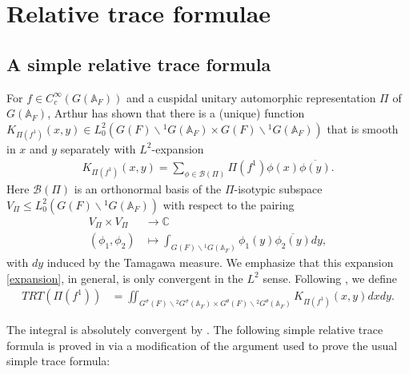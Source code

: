 \documentclass[12pt]{amsart}
\theoremstyle{remark}
\numberwithin{equation}{section}
\newcommand{\A}{\mathbb{A}}
\newcommand{\lto}{\longrightarrow}
\newcommand{\CC}{\mathbb{C}}
\theoremstyle{definition}
\numberwithin{equation}{subsection}
\begin{document}
\section{Relative trace formulae}
\label{sec-rtf}

\subsection{A simple relative trace formula} \label{ssec-sRTF}

For $f \in C_c^{\infty}(G(\A_F))$ and a cuspidal unitary automorphic representation $\Pi$ of $G(\A_F)$, Arthur has shown \cite[Lemma 4.5, Lemma 4.8]{A}
that there is a (unique) function $K_{\Pi(f^1)}(x,y) \in L_0^2(G(F) \backslash {}^1G(\A_F) \times G(F) \backslash {}^1G(\A_F))$  that is smooth in $x$ and $y$ separately with $L^2$-expansion
\begin{align} \label{expansion}
K_{\Pi(f^1)}(x,y)=\sum_{\phi \in \mathcal{B}(\Pi)} \Pi(f^1){\phi}(x)\overline{{\phi}(y)}.
\end{align}
Here $\mathcal{B}(\Pi)$  is an orthonormal basis of the $\Pi$-isotypic subspace $V_{\Pi} \leq L^2_0(G(F) \backslash {}^1G(\A_F))$ with respect to the pairing
\begin{align} \label{ortho-pair}
V_{\Pi} \times V_{\Pi} &\lto \CC\\
\nonumber (\phi_1,\phi_2) &\longmapsto \int_{G(F) \backslash {}^1G(\A_F)} \phi_1(y) \overline{{\phi}_2(y)}dy,
\end{align}
with $dy$ induced by the Tamagawa measure.
We emphasize that this expansion \eqref{expansion}, in general, is only convergent in the $L^2$ sense.
Following \cite{Hahn}, we define
\begin{align}
TRT(\Pi(f^1))&=\iint_{G^{\sigma}(F) \backslash {}^2G^{\sigma}(\A_F) \times G^{\theta}(F) \backslash {}^2G^{\theta}(\A_F)} K_{\Pi(f^1)}(x,y)dxdy.
\end{align} 

\noindent
The integral is absolutely convergent by \cite[\S 2, Proposition 1]{AGR}.
The following simple relative trace formula is proved in \cite{Hahn} via a modification of the
argument used to prove the usual simple trace formula:
\end{document}
